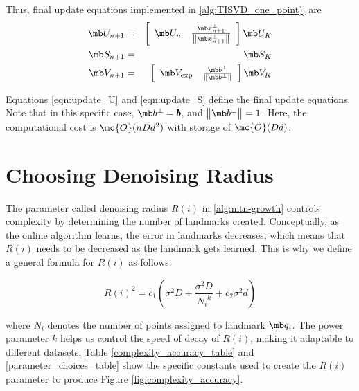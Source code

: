 Thus, final update equations implemented in \cref{alg:TISVD_one_point)} are
\begin{eqnarray}
    \mb U_{n+1} &=& \left[ \begin{array}{cc} \mb U_n & \frac{\mb x_{n+1}^\perp}{\left \|\mb x_{n+1}^\perp \right \|} \end{array} \right] \mb U_K \label{eqn:update_U} \\
    \mb S_{n+1} &=& \mb S_K \label{eqn:update_S} \\
    \mb V_{n+1} &=&  \left[ \begin{array}{cc} \mb V_{\text{exp}} & \frac{\mb b^\perp}{\left \|\mb b^\perp \right \|} \end{array} \right] \mb V_K \label{eqn:update_V}
\end{eqnarray}

Equations \eqref{eqn:update_U} and  \eqref{eqn:update_S} define the final update equations. Note that in this specific case, $\mb b^\perp = \pmb b$, and $\left\| \mb b^\perp \right\| = 1 $. Here, the computational cost is $\mc{O}(nDd^2)$ with storage of $\mc{O}(Dd)$. 








\section{Choosing Denoising Radius} \label{sec:R_i_description}

The parameter called denoising radius $R(i)$ in \cref{alg:mtn-growth} controls complexity by determining the number of landmarks created. Conceptually, as the online algorithm learns, the error in landmarks decreases, which means that $R(i)$ needs to be decreased as the landmark gets learned. This is why we define a general formula for $R(i)$ as follows:

\begin{equation}
    R(i)^2 = c_1 \left(\sigma^2 D + \frac{\sigma^2 D}{{N_i}^k} + c_2\sigma^2 d \right)
\end{equation}

\noindent where $N_i$ denotes the number of points assigned to landmark $\mb q_i$. The power parameter $k$ helps us control the speed of decay of $R(i)$, making it adaptable to different datasets. Table \ref{complexity_accuracy_table} and \ref{parameter_choices_table} show the specific constants used to create the $R(i)$ parameter to produce Figure \ref{fig:complexity_accuracy}.



